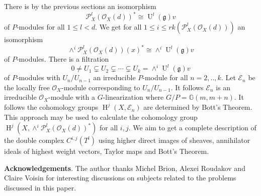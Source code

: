 \documentclass{amsart}
\theoremstyle{plain}
\theoremstyle{definition}
\theoremstyle{remark}
\numberwithin{equation}{theorem}
\begin{document}
There is by the previous sections an isomorphism
\[ {\mathcal{P} }^l_X({\mathcal{O} }_X(d))^* \cong {\operatorname{U}}^l({\mathfrak{g}})v \]
of $P$-modules for all $1\leq l <d$. We get for all $1\leq i \leq rk({\mathcal{P} }^l_X({\mathcal{O} }_X(d)))$ 
an isomorphism
\[ \wedge^i {\mathcal{P} }^l_X({\mathcal{O} }_X(d))(x)^* \cong \wedge^i {\operatorname{U}}^l({\mathfrak{g}})v \]
of $P$-modules.
There is a filtration
\[ 0 \neq U_1\subsetneq U_2 \subsetneq \cdots \subsetneq U_k=\wedge^i
{\operatorname{U}}^l({\mathfrak{g}})v \]
of $P$-modules with $U_n/U_{n-1}$ an irreducible $P$-module for all $n=2,..,k$. Let ${\mathcal{E}}_n$ be the
locally free ${\mathcal{O} }_X$-module corresponding to $U_n/U_{n-1}$. It follows
${\mathcal{E}}_n$ is an irreducible ${\mathcal{O} }_X$-module with a $G$-linearization where
$G/P={\mathbb{G} }(m,m+n)$. It follows the cohomology groups ${\operatorname{H} }^j(X,{\mathcal{E}}_n)$
are determined by Bott's Theorem. This approach may be used to
calculate the cohomology group ${\operatorname{H} }^j(X,\wedge^i {\mathcal{P} }^l_X({\mathcal{O} }_X(d))^*)$
for all $i,j$. We aim to get a complete description of the double complex
$C^{i,j}(T^l)$ using higher direct images of sheaves, annihilator
ideals of highest weight vectors, Taylor maps and Bott's Theorem.

\textbf{Acknowledgements}. The author  thanks Michel Brion, Alexei Roudakov and Claire Voisin for 
interesting discussions on subjects related to the problems discussed in this paper. 
\end{document}
